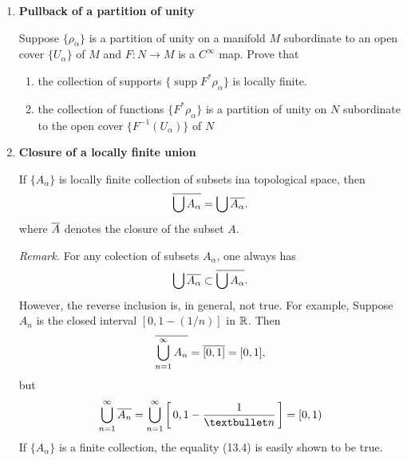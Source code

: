 \documentclass[12pt,a4paper]{report}
\newcommand{\SUPP}{\operatorname{supp}}
\begin{document}
\begin{enumerate}[label=13.\arabic*]
	\item \textbf{Pullback of a partition of unity}
	
	Suppose $\{\rho_\alpha\}$ is a partition of unity on a manifold $M$ subordinate to an open cover $\{U_\alpha\}$ of $M$ and $F :N \to M$ is a $C^\infty$ map. Prove that 
	\begin{enumerate}[label=(\alph*)]
		
		\item the collection of supports $\{\SUPP F^* \rho_\alpha\}$ is locally finite.
		
		\item the collection of functions $\{F^*\rho_\alpha\}$ is a partition of unity on $N$ subordinate to the open cover $\{F^{-1}(U_\alpha)\}$ of $N$
		
	\end{enumerate}
		
		\item \textbf{Closure of a locally finite union}
		
		If $\{A_\alpha\}$ is locally finite collection of subsets ina  topological space, then 
		\begin{align*}
			\overline{\bigcup A_\alpha} = \bigcup \overline{A_\alpha}.
		\end{align*}where $\overline{A}$ denotes the closure of the subset $A$.
		
		\textit{Remark.}  For any colection of subsets $A_\alpha$, one always has 
		\begin{align*}
			\bigcup \overline{A_\alpha} \subset \overline{\bigcup A_\alpha}.
		\end{align*}However, the reverse inclusion is, in general, not true.  For example, Suppose $A_n$ is the closed interval $[0,1-(1/n)]$ in $\mathbb{R}$.  Then 
		\begin{align*}
			\overline{\bigcup_{n=1}^\infty A_n} = \overline{[0,1]} = [0,1],
		\end{align*}but
		\begin{align*}
			\bigcup_{n=1}^\infty\CONJ{A_n}
=\bigcup_{n=1}^\infty\SQBRACKET{0,1-\frac{1}{•n}} = [0,1)
		\end{align*}If $\{A_\alpha\}$ is a finite collection, the equality (13.4) is easily shown to be true.


\end{enumerate}
\end{document}
